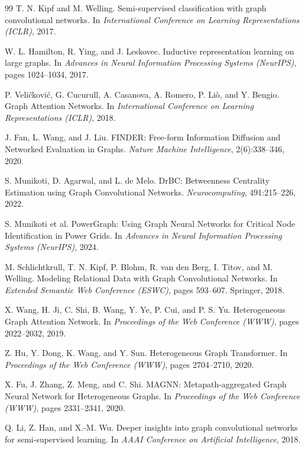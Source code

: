 \documentclass[sigconf,9pt,anonymous]{acmart}
\begin{document}
\begin{thebibliography}{99}
T. N. Kipf and M. Welling. Semi-supervised classification with graph convolutional networks. In \emph{International Conference on Learning Representations (ICLR)}, 2017.

W. L. Hamilton, R. Ying, and J. Leskovec. Inductive representation learning on large graphs. In \emph{Advances in Neural Information Processing Systems (NeurIPS)}, pages 1024--1034, 2017.

P. Veličković, G. Cucurull, A. Casanova, A. Romero, P. Liò, and Y. Bengio. Graph Attention Networks. In \emph{International Conference on Learning Representations (ICLR)}, 2018.

J. Fan, L. Wang, and J. Liu. FINDER: Free-form Information Diffusion and Networked Evaluation in Graphs. \emph{Nature Machine Intelligence}, 2(6):338--346, 2020.

S. Munikoti, D. Agarwal, and L. de Melo. DrBC: Betweenness Centrality Estimation using Graph Convolutional Networks. \emph{Neurocomputing}, 491:215--226, 2022.

S. Munikoti et al. PowerGraph: Using Graph Neural Networks for Critical Node Identification in Power Grids. In \emph{Advances in Neural Information Processing Systems (NeurIPS)}, 2024.

M. Schlichtkrull, T. N. Kipf, P. Blohm, R. van den Berg, I. Titov, and M. Welling. Modeling Relational Data with Graph Convolutional Networks. In \emph{Extended Semantic Web Conference (ESWC)}, pages 593--607. Springer, 2018.

X. Wang, H. Ji, C. Shi, B. Wang, Y. Ye, P. Cui, and P. S. Yu. Heterogeneous Graph Attention Network. In \emph{Proceedings of the Web Conference (WWW)}, pages 2022--2032, 2019.

Z. Hu, Y. Dong, K. Wang, and Y. Sun. Heterogeneous Graph Transformer. In \emph{Proceedings of the Web Conference (WWW)}, pages 2704--2710, 2020.

X. Fu, J. Zhang, Z. Meng, and C. Shi. MAGNN: Metapath-aggregated Graph Neural Network for Heterogeneous Graphs. In \emph{Proceedings of the Web Conference (WWW)}, pages 2331--2341, 2020.

Q. Li, Z. Han, and X.-M. Wu. Deeper insights into graph convolutional networks for semi-supervised learning. In \emph{AAAI Conference on Artificial Intelligence}, 2018.
\end{thebibliography}
\end{document}
